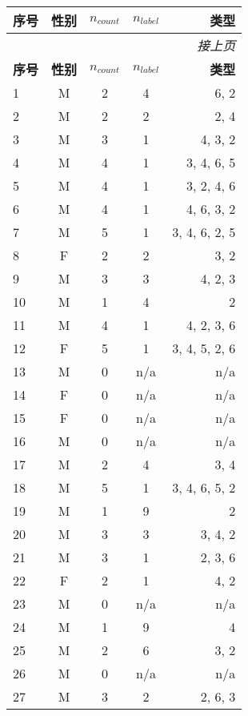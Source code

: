 
\begin{center}
    \setlength{\tabcolsep}{25pt}
  \begin{longtable}{ l c c c r }

    \hline \textbf{序号} & \textbf{性别} & \textbf{$n_{count}$} &
    \textbf{$n_{label}$} & \textbf{类型} \\
    \hline \hline
    \endfirsthead
    \multicolumn{5}{r}{\textit{接上页}} \\
    \hline
    \textbf{序号} & \textbf{性别} & \textbf{$n_{count}$} & \textbf{$n_{label}$} & \textbf{类型} \\
    \hline \hline
    \endhead
    \hline
    \endfoot
    \endlastfoot

    1 & M & 2 & 4 & 6, 2\\
    2 & M & 2 & 2 & 2, 4 \\
    3 & M & 3 & 1 & 4, 3, 2 \\
    4 & M & 4 & 1 & 3, 4, 6, 5 \\
    5 & M & 4 & 1 & 3, 2, 4, 6 \\
    6 & M & 4 & 1 & 4, 6, 3, 2 \\
    7 & M & 5 & 1 & 3, 4, 6, 2, 5 \\
    8 & F & 2 & 2 & 3, 2 \\
    9 & M & 3 & 3 & 4, 2, 3 \\
    10 & M & 1 & 4 & 2 \\
    11 & M & 4 & 1 & 4, 2, 3, 6 \\
    12 & F & 5 & 1 & 3, 4, 5, 2, 6 \\
    13 & M & 0 & n/a & n/a \\
    14 & F & 0 & n/a & n/a \\
    15 & F & 0 & n/a & n/a \\
    16 & M & 0 & n/a & n/a \\
    17 & M & 2 & 4 & 3, 4 \\
    18 & M & 5 & 1 & 3, 4, 6, 5, 2 \\
    19 & M & 1 & 9 & 2 \\
    20 & M & 3 & 3 & 3, 4, 2 \\
    21 & M & 3 & 1 & 2, 3, 6 \\
    22 & F & 2 & 1 & 4, 2 \\
    23 & M & 0 & n/a & n/a \\
    24 & M & 1 & 9 & 4 \\
    25 & M & 2 & 6 & 3, 2 \\
    26 & M & 0 & n/a & n/a \\
    27 & M & 3 & 2 & 2, 6, 3 \\

\end{longtable}
\end{center}
